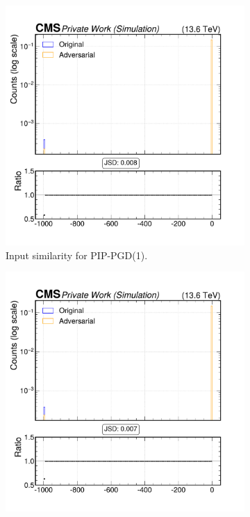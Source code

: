 \begin{figure}[h]
  \centering
  \begin{subfigure}[t]{0.32\textwidth}
    \includegraphics[width=\linewidth]{media/output/features/compare/combined_it_1/cmp_global_features_TagVarCSV_trackSip2dValAboveCharm.pdf}
    \caption*{Input similarity for PIP-PGD(1).}
  \end{subfigure}\hfill
  \begin{subfigure}[t]{0.32\textwidth}
    \includegraphics[width=\linewidth]{media/output/features/compare/combined_it_2/cmp_global_features_TagVarCSV_trackSip2dValAboveCharm.pdf}

\end{subfigure}
\end{figure}
